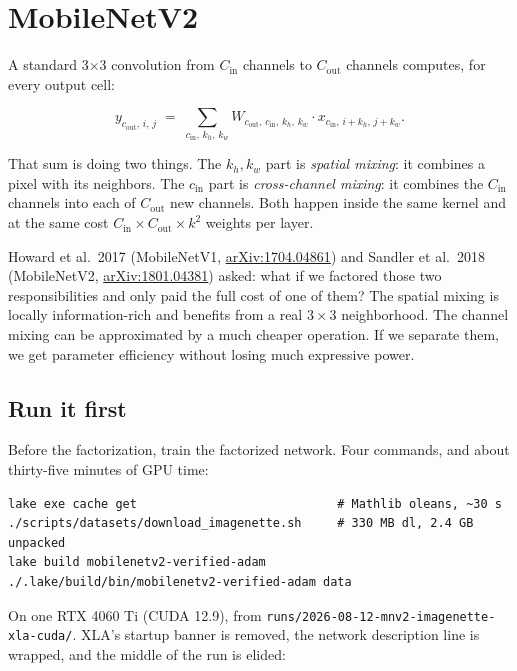 \chapter{MobileNetV2}
\label{chap:depthwise}


A standard 3$\times$3 convolution from \(C_\text{in}\) channels to
\(C_\text{out}\) channels computes, for every output cell:

\[
y_{c_\text{out},\,i,\,j}
\;=\;
\sum_{c_\text{in},\,k_h,\,k_w}
W_{c_\text{out},\,c_\text{in},\,k_h,\,k_w}
\cdot
x_{c_\text{in},\,i+k_h,\,j+k_w}.
\]

That sum is doing two things. The \(k_h, k_w\) part is
\emph{spatial mixing}: it combines a pixel with its neighbors. The
\(c_\text{in}\) part is \emph{cross-channel mixing}: it combines
the \(C_\text{in}\) channels into each of \(C_\text{out}\) new
channels. Both happen inside the same kernel and at the same cost
\(C_\text{in} \times C_\text{out} \times k^2\) weights per layer.

Howard et al.\ 2017 (MobileNetV1,
\href{https://arxiv.org/abs/1704.04861}{arXiv:1704.04861}) and Sandler
et al.\ 2018 (MobileNetV2,
\href{https://arxiv.org/abs/1801.04381}{arXiv:1801.04381})
asked: what if we factored those two responsibilities and only
paid the full cost of one of them? The spatial mixing is locally
information-rich and benefits from a real \(3 \times 3\)
neighborhood. The channel mixing can be approximated by a much
cheaper operation. If we separate them, we get parameter
efficiency without losing much expressive power.

\section{Run it first}
\label{sec:mnv2_runit}

Before the factorization, train the factorized network. Four commands,
and about thirty-five minutes of GPU time:

\begin{verbatim}
lake exe cache get                            # Mathlib oleans, ~30 s
./scripts/datasets/download_imagenette.sh     # 330 MB dl, 2.4 GB unpacked
lake build mobilenetv2-verified-adam
./.lake/build/bin/mobilenetv2-verified-adam data
\end{verbatim}

On one RTX 4060 Ti (CUDA 12.9), from
\texttt{runs/2026-08-12-mnv2-imagenette-xla-cuda/}. XLA's startup banner
is removed, the network description line is wrapped, and the middle of
the run is elided:

